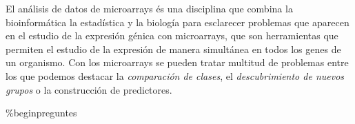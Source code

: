 
\newpage
\previs[Resumen]

 El an\'alisis de datos de microarrays \'es una disciplina que combina la bioinform\'atica la estad\'istica y la biolog\'ia para esclarecer problemas que aparecen en el estudio de la expresi\'on g\'enica con microarrays, que son herramientas que permiten el estudio de la expresi\'on de manera simult\'anea en todos los genes de un organismo. Con los microarrays se pueden tratar multitud de problemas entre los que podemos destacar la \emph{comparaci\'on de clases}, el \emph{descubrimiento de nuevos grupos} o la construcci\'on de predictores.



\%begin{preguntes}



















